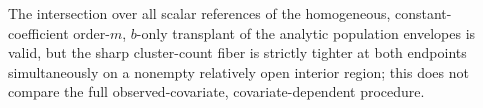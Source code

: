 The intersection over all scalar references of the homogeneous, constant-coefficient order-\(m\), \(b\)-only transplant of the analytic population envelopes is valid, but the sharp cluster-count fiber is strictly tighter at both endpoints simultaneously on a nonempty relatively open interior region; this does not compare the full observed-covariate, covariate-dependent procedure.